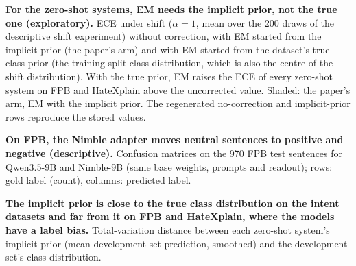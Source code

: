 \begin{table}[htbp]
  \centering
  \caption{\textbf{For the zero-shot systems, EM needs the implicit prior, not the true one (exploratory).} ECE under
  shift ($\alpha=1$, mean over the 200 draws of the descriptive shift experiment) without correction, with EM started
  from the implicit prior (the paper's arm) and with EM started from the dataset's true class prior (the training-split
  class distribution, which is also the centre of the shift distribution). With the true prior, EM raises the ECE of
  every zero-shot system on FPB and HateXplain above the uncorrected value. Shaded: the paper's arm, EM with the
  implicit prior. The regenerated no-correction and implicit-prior rows reproduce the stored values.}
  \label{tab:emtrueprior}
  \scriptsize
  \setlength{\tabcolsep}{3pt}
  
\end{table}

\begin{table}[htbp]
  \centering
  \caption{\textbf{On FPB, the Nimble adapter moves neutral sentences to positive and negative (descriptive).} Confusion
  matrices on the 970 FPB test sentences for Qwen3.5-9B and Nimble-9B (same base weights, prompts and readout); rows:
  gold label (count), columns: predicted label.}
  \label{tab:fpbconf}
  \scriptsize
  
\end{table}

\begin{table}[htbp]
  \centering
  \caption{\textbf{The implicit prior is close to the true class distribution on the intent datasets and far from it
  on FPB and HateXplain, where the models have a label bias.} Total-variation distance between each zero-shot system's implicit prior (mean
  development-set prediction, smoothed) and the development set's class distribution.}
  \label{tab:implicitprior}
  \scriptsize
  
\end{table}

